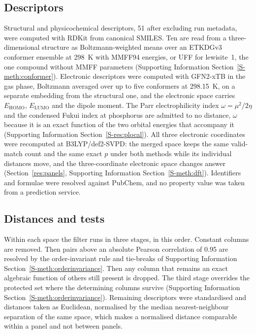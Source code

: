 \documentclass[journal=jacsat,manuscript=article,margin=1in]{achemso}
\begin{document}
\subsection{Descriptors}
\label{meth:descriptors}
Structural and physicochemical descriptors, 51 after excluding run metadata,
were computed with RDKit from canonical SMILES. Ten are read from a
three-dimensional structure as Boltzmann-weighted means over an ETKDGv3
conformer ensemble at 298~K with MMFF94 energies, or UFF for lewisite~1, the
one compound without MMFF parameters (Supporting Information
Section~\ref{S-meth:conformer}). Electronic descriptors were computed with
GFN2-xTB in the gas phase, Boltzmann averaged over up to five conformers at
298.15~K, on a separate embedding from the structural one, and the electronic
space carries $E_\mathrm{HOMO}$, $E_\mathrm{LUMO}$ and the dipole moment. The
Parr electrophilicity index $\omega = \mu^{2}/2\eta$ and the condensed Fukui
index at phosphorus are admitted to no distance, $\omega$ because it is an
exact function of the two orbital energies that accompany it (Supporting
Information Section~\ref{S-res:plocal}). All three electronic coordinates were
recomputed at B3LYP/def2-SVPD: the merged space keeps the same valid-match
count and the same exact $p$ under both methods while its individual distances
move, and the three-coordinate electronic space changes answer
(Section~\ref{res:panels}, Supporting Information
Section~\ref{S-meth:dft}). Identifiers and formulae were resolved against
PubChem, and no property value was taken from a prediction service.

\subsection{Distances and tests}
\label{meth:spaces}
Within each space the filter runs in three stages, in this order. Constant
columns are removed. Then pairs above an absolute Pearson correlation of 0.95
are resolved by the order-invariant rule and tie-breaks of Supporting
Information Section~\ref{S-meth:orderinvariance}. Then
any column that remains an exact algebraic function of others still present
is dropped.
The third stage overrides the protected set where the determining columns
survive (Supporting Information Section~\ref{S-meth:orderinvariance}).
Remaining descriptors were standardised and distances taken as Euclidean,
normalised by the median nearest-neighbour separation of the same space,
which makes a normalised distance comparable within a panel and not between
panels.
\end{document}
